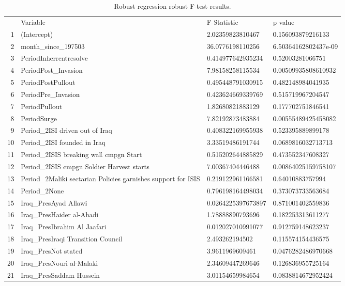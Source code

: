 \begin{table}[ht]
  \label{tab:robustregFtest}
\begin{adjustbox}{width=1\textwidth}
\small    
\centering
\begin{tabular}{rlll}
  \hline
 & Variable & F-Statistic & p value \\ 
  
1 & (Intercept) & 2.02359823810467 & 0.156093879216133 \\ 
  2 & month\_since\_197503 & 36.0776198110256 & 6.50364162802437e-09 \\ 
  3 & PeriodInherrentresolve & 0.414977642935234 & 0.52003281066751 \\ 
  4 & PeriodPost\_Invasion & 7.98158258115534 & 0.00509935808610932 \\ 
  5 & PeriodPostPullout & 0.495448791030915 & 0.482148984041935 \\ 
  6 & PeriodPre\_Invasion & 0.423624669339769 & 0.515719967204547 \\ 
  7 & PeriodPullout & 1.82680821883129 & 0.177702751846541 \\ 
  8 & PeriodSurge & 7.82192873483884 & 0.00555489425458082 \\ 
  9 & Period\_2ISI driven out of Iraq & 0.408322169955938 & 0.523395889899178 \\ 
  10 & Period\_2ISI founded in Iraq & 3.33519486191744 & 0.0689816032713713 \\ 
  11 & Period\_2ISIS breaking wall cmpgn Start & 0.515202644885829 & 0.473552347608327 \\ 
  12 & Period\_2ISIS cmpgn Soldier Harvest starts & 7.00367404446488 & 0.00864025159758107 \\ 
  13 & Period\_2Maliki sectarian Policies garnishes support for ISIS & 0.219122961166581 & 0.64010883757994 \\ 
  14 & Period\_2None & 0.796198164498034 & 0.373073733563684 \\ 
  15 & Iraq\_PresAyad Allawi & 0.0264225397673897 & 0.871001402559836 \\ 
  16 & Iraq\_PresHaider al-Abadi & 1.78888890793696 & 0.182253313611277 \\ 
  17 & Iraq\_PresIbrahim Al Jaafari & 0.012027010991077 & 0.912759148623237 \\ 
  18 & Iraq\_PresIraqi Transition Council & 2.493262194502 & 0.115574154436575 \\ 
  19 & Iraq\_PresNot stated & 3.9611969609461 & 0.0476282486970668 \\ 
  20 & Iraq\_PresNouri al-Malaki & 2.34609447269646 & 0.126836955725164 \\ 
  21 & Iraq\_PresSaddam Hussein & 3.01154659984654 & 0.0838814672952424 \\ 
   \hline
\end{tabular}
\end{adjustbox}
\caption{Robust regression robust F-test results.}
\end{table}




